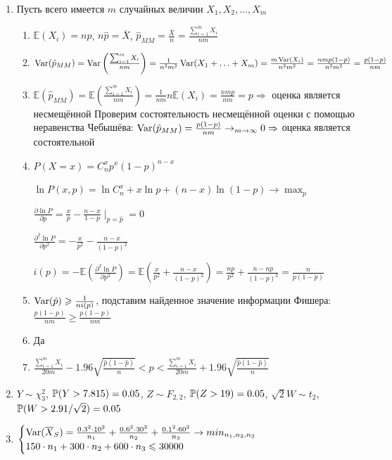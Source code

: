 \documentclass[12pt, a4paper]{article}\usepackage[]{graphicx}\usepackage[]{color}
\begin{document}
\begin{enumerate}
	\item Пусть всего имеется $m$ случайных величин $X_1, X_2, \ldots , X_m $
		\begin{enumerate}
			\item $\mathbb{E}(X_i) = np$, $n\hat{p} = \overline{X}$, $\hat{p}_{MM} = \frac{\overline{X}}{n} = \frac{\sum_{i=1}^m X_i}{nm}$
			\item $\Var(\hat{p}_{MM}) = \Var\left(\frac{\sum_{i=1}^m X_i}{nm}\right) = \frac{1}{n^2m^2} \Var(X_1 + \ldots + X_m) = \frac{m \Var(X_i)}{n^2m^2} = \frac{nmp(1-p)}{n^2m^2} = \frac{p(1-p)}{nm}$
			\item $\mathbb{E}(\hat{p}_{MM}) = \mathbb{E}\left(\frac{\sum_{i=1}^m X_i}{nm}\right) = \frac{1}{nm}n\mathbb{E}(X_i) = \frac{nmp}{nm} = p \Rightarrow$ оценка является несмещённой
			Проверим состоятельность несмещённой оценки с помощью неравенства Чебышёва:
			$\Var(\hat{p}_{MM}) = \frac{p(1-p)}{nm} \to_{m\to\infty} 0 \Rightarrow$ оценка является состоятельной
			\item $P(X=x) = C^x_n p^x (1-p)^{n-x}$

			$\ln P(x, p) = \ln C^x_n + x\ln p + (n-x) \ln (1-p) \to \max_p$

			$\frac{\partial \ln P}{\partial p} = \frac{x}{p} - \frac{n-x}{1-p} \mid_{p=\hat{p}} = 0$

			$\frac{\partial^2 \ln P}{\partial p^2} = -\frac{x}{p^2} - \frac{n-x}{(1-p)^2}$

			$i(p) = -\mathbb{E}\left(\frac{\partial^2 \ln P}{\partial p^2}\right) = \mathbb{E}\left(\frac{x}{p^2} + \frac{n-x}{(1-p)^2}\right) = \frac{np}{p^2} + \frac{n-np}{(1-p)^2} = \frac{n}{p(1-p)}$

			\item $\Var(\hat{p}) \geq \frac{1}{ni(p)}$, подставим найденное значение информации Фишера: $\frac{p(1-p)}{nm} \geq \frac{p(1-p)}{nm}$

			\item Да

			\item $\frac{\sum_{i=1}^m X_i}{20m} - 1.96 \sqrt{\frac{\hat{p}(1-\hat{p})}{n}}  < p < \frac{\sum_{i=1}^m X_i}{20m} + 1.96 \sqrt{\frac{\hat{p}(1-\hat{p})}{n}} $
		\end{enumerate}

	\item $Y \sim \chi^2_3$, $\P(Y>7.815)=0.05$, $Z \sim F_{2,2}$, $\P(Z>19)=0.05$, $\sqrt{2}W \sim t_{2}$, $\P(W > 2.91/\sqrt{2})=0.05$

	\item
	   $
		\begin{cases}
			\Var(\overline{X}_S) = \frac{0.3^2\cdot 10^2}{n_1} + \frac{0.6^2 \cdot 30^2}{n_2} + \frac{0.1^2 \cdot 60^2}{n_3} \to min_{n_1, n_2, n_3} \\
			150\cdot n_1 + 300 \cdot n_2 + 600 \cdot n_3 \leq 30000
		\end{cases}
	   $


\end{enumerate}
\end{document}
